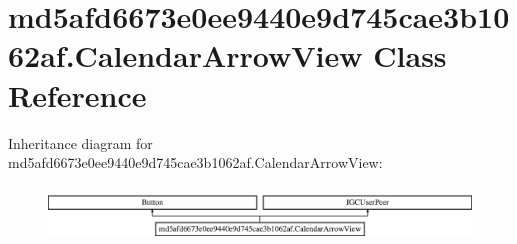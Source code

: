 \hypertarget{classmd5afd6673e0ee9440e9d745cae3b1062af_1_1CalendarArrowView}{}\section{md5afd6673e0ee9440e9d745cae3b1062af.\+Calendar\+Arrow\+View Class Reference}
\label{classmd5afd6673e0ee9440e9d745cae3b1062af_1_1CalendarArrowView}
Inheritance diagram for md5afd6673e0ee9440e9d745cae3b1062af.\+Calendar\+Arrow\+View\+:\begin{figure}[H]
\begin{center}
\leavevmode
\includegraphics[height=1.473684cm]{classmd5afd6673e0ee9440e9d745cae3b1062af_1_1CalendarArrowView}
\end{center}
\end{figure}
